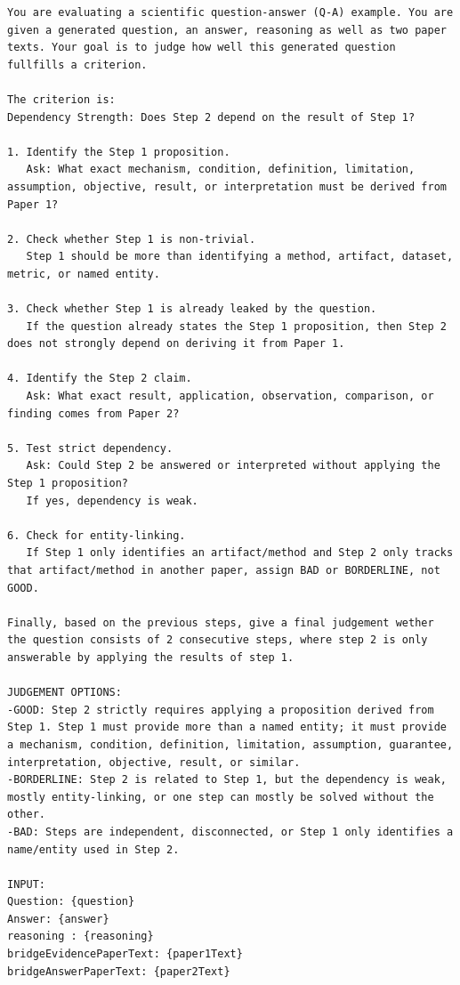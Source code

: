 \begin{lstlisting}[caption={Dependency Strength Prompt}, label={lst:DependencyStrengthPrompt}]
    You are evaluating a scientific question-answer (Q-A) example. You are given a generated question, an answer, reasoning as well as two paper texts. Your goal is to judge how well this generated question fullfills a criterion.

The criterion is:
Dependency Strength: Does Step 2 depend on the result of Step 1?

1. Identify the Step 1 proposition.
   Ask: What exact mechanism, condition, definition, limitation, assumption, objective, result, or interpretation must be derived from Paper 1?

2. Check whether Step 1 is non-trivial.
   Step 1 should be more than identifying a method, artifact, dataset, metric, or named entity.

3. Check whether Step 1 is already leaked by the question.
   If the question already states the Step 1 proposition, then Step 2 does not strongly depend on deriving it from Paper 1.

4. Identify the Step 2 claim.
   Ask: What exact result, application, observation, comparison, or finding comes from Paper 2?

5. Test strict dependency.
   Ask: Could Step 2 be answered or interpreted without applying the Step 1 proposition?
   If yes, dependency is weak.

6. Check for entity-linking.
   If Step 1 only identifies an artifact/method and Step 2 only tracks that artifact/method in another paper, assign BAD or BORDERLINE, not GOOD.

Finally, based on the previous steps, give a final judgement wether the question consists of 2 consecutive steps, where step 2 is only answerable by applying the results of step 1.

JUDGEMENT OPTIONS:
-GOOD: Step 2 strictly requires applying a proposition derived from Step 1. Step 1 must provide more than a named entity; it must provide a mechanism, condition, definition, limitation, assumption, guarantee, interpretation, objective, result, or similar.
-BORDERLINE: Step 2 is related to Step 1, but the dependency is weak, mostly entity-linking, or one step can mostly be solved without the other.
-BAD: Steps are independent, disconnected, or Step 1 only identifies a name/entity used in Step 2.

INPUT:
Question: {question}
Answer: {answer}
reasoning : {reasoning}
bridgeEvidencePaperText: {paper1Text}
bridgeAnswerPaperText: {paper2Text}


\end{lstlisting}
